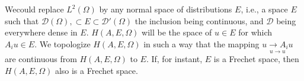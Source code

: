 We\pageoriginale could replace $L^2 (\Omega)$ by any normal space of distributions
$E$, i.e., a space $E$ such that $\mathscr{D}(\Omega),\subset E \subset
\mathscr{D'} (\Omega)$ the inclusion being continuous, and
$\mathscr{D}$ being everywhere dense in $E$. $H(A,E, \Omega)$ will be
the space of $u \in E$ for which $A_i u \in E$. We
topologize $H(A, E, \Omega)$ in such a way that the mapping $\underset
{u \to u}{u \to A_i u}$ are continuous from $H(A, E, \Omega)$ to
$E$. If, for instant, $E$ is a Frechet space, then $H(A, E, \Omega)$
also is a Frechet space. 

